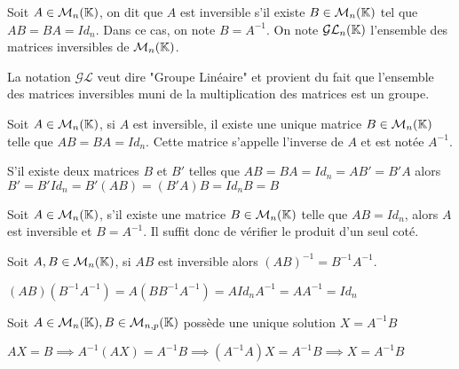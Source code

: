 \documentclass[a4paper, 12pt]{article}
\begin{document}
\begin{definition}
    Soit $A \in \mathcal{M}_n(\mathbb{K})$, on dit que $A$ est inversible s'il existe $B \in \mathcal{M}_n(\mathbb{K})$ tel que $AB = BA = Id_n$.
    Dans ce cas, on note $B = A^{-1}$.
    On note $\mathcal{GL}_n(\mathbb{K})$ l'ensemble des matrices inversibles de $\mathcal{M}_n(\mathbb{K})$.
\end{definition}

\begin{remark}
    La notation $\mathcal{GL}$ veut dire "Groupe Linéaire" et provient du fait que l'ensemble des matrices inversibles muni de la multiplication des matrices est un groupe.
\end{remark}

\begin{proposition}
    Soit $A \in \mathcal{M}_n(\mathbb{K})$, si $A$ est inversible, il existe une unique matrice $B \in \mathcal{M}_n(\mathbb{K})$ telle que $AB = BA = Id_n$.
    Cette matrice s'appelle l'inverse de $A$ et est notée $A^{-1}$.
\end{proposition}

\begin{demonstration}
    S'il existe deux matrices $B$ et $B'$ telles que $AB = BA = Id_n = AB' = B'A$ alors $B' = B'Id_n = B'(AB) = (B'A)B = Id_nB = B$
\end{demonstration}

\begin{proposition}
    Soit $A \in \mathcal{M}_n(\mathbb{K})$, s'il existe une matrice $B \in \mathcal{M}_n(\mathbb{K})$ telle que $AB = Id_n$, alors $A$ est inversible et $B = A^{-1}$.
    Il suffit donc de vérifier le produit d'un seul coté.
\end{proposition}

\begin{proposition}
    Soit $A, B \in \mathcal{M}_n(\mathbb{K})$, si $AB$ est inversible alors $(AB)^{-1} = B^{-1}A^{-1}$.
\end{proposition}

\begin{demonstration}
    $(AB)(B^{-1}A^{-1}) = A(BB^{-1}A^{-1}) = AId_nA^{-1} = AA^{-1} = Id_n$
\end{demonstration}

\begin{proposition}
    Soit $A \in \mathcal{M}_n(\mathbb{K}), B \in \mathcal{M}_{n,p}(\mathbb{K})$ possède une unique solution $X = A^{-1}B$
\end{proposition}

\begin{demonstration}
    $AX = B \implies A^{-1}(AX) = A^{-1}B \implies (A^{-1}A)X = A^{-1}B \implies X = A^{-1}B$
\end{demonstration}
\end{document}
